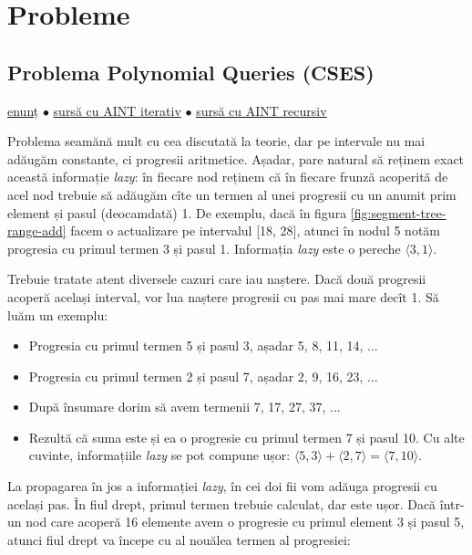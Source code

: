\section{Probleme}

\subsection{Problema Polynomial Queries (CSES)}

\href{https://cses.fi/problemset/task/1736}{enunț}
$\bullet$
\href{https://github.com/CatalinFrancu/nerdvana/blob/main/problems/cses/1736-polynomial-queries/segtree-iter.cpp}{sursă cu AINT iterativ}
$\bullet$
\href{https://github.com/CatalinFrancu/nerdvana/blob/main/problems/cses/1736-polynomial-queries/segtree-v2.cpp}{sursă cu AINT recursiv}

Problema seamănă mult cu cea discutată la teorie, dar pe intervale nu mai adăugăm constante, ci progresii aritmetice. Așadar, pare natural să reținem exact această informație \textit{lazy}: în fiecare nod reținem că în fiecare frunză acoperită de acel nod trebuie să adăugăm cîte un termen al unei progresii cu un anumit prim element și pasul (deocamdată) 1. De exemplu, dacă în figura \ref{fig:segment-tree-range-add} facem o actualizare pe intervalul [18, 28], atunci în nodul 5 notăm progresia cu primul termen 3 și pasul 1. Informația \textit{lazy} este o pereche $\langle 3,1 \rangle$.

Trebuie tratate atent diversele cazuri care iau naștere. Dacă două progresii acoperă același interval, vor lua naștere progresii cu pas mai mare decît 1. Să luăm un exemplu:

\begin{itemize}
  \item Progresia cu primul termen 5 și pasul 3, așadar 5, 8, 11, 14, ...
  \item Progresia cu primul termen 2 și pasul 7, așadar 2, 9, 16, 23, ...
  \item După însumare dorim să avem termenii 7, 17, 27, 37, ...
  \item Rezultă că suma este și ea o progresie cu primul termen 7 și pasul 10. Cu alte cuvinte, informațiile \textit{lazy} se pot compune ușor: $\langle 5,3 \rangle + \langle 2,7 \rangle = \langle 7,10 \rangle$.
\end{itemize}

La propagarea în jos a informației \textit{lazy}, în cei doi fii vom adăuga progresii cu același pas. În fiul drept, primul termen trebuie calculat, dar este ușor. Dacă într-un nod care acoperă 16 elemente avem o progresie cu primul element 3 și pasul 5, atunci fiul drept va începe cu al nouălea termen al progresiei:

